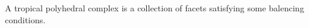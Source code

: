 

    A tropical polyhedral complex is a collection of facets satisfying some balencing conditions. 

